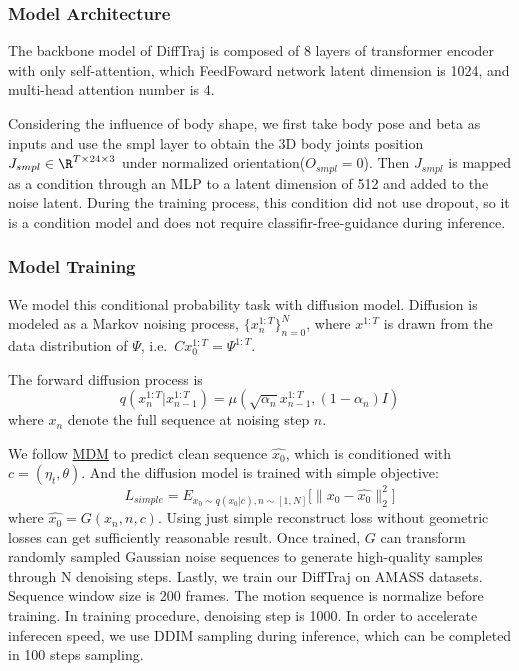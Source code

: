 \documentclass{article}
\begin{document}

\subsubsection{Model Architecture}\label{model-architecture}

The backbone model of DiffTraj is composed of  8 layers of transformer encoder with only self-attention, which FeedFoward network latent dimension is 1024, and multi-head attention number is 4.

Considering the influence of body shape, we first take body pose and beta as inputs and use the smpl layer to obtain the 3D body joints position $J_{smpl} \in \R^{T \times 24 \times 3}$ under normalized orientation($O_{smpl}=0$). Then $J_{smpl}$ is mapped as a condition through an MLP to a latent dimension of 512 and added to the noise latent. During the training process, this condition did not use dropout, so it is a condition model and does not require classifir-free-guidance during inference.

\subsubsection{Model Training}\label{model-training}

We model this conditional probability task with diffusion model. Diffusion is modeled as a Markov noising process, ${\{x^{1:T}_n\}_{n=0}^N}$, where $x^{1:T}$ is drawn from the data distribution of $\Psi$, i.e.~$Cx^{1:T}_0=\Psi^{1:T}$.

The forward diffusion process is \[
q(x_{n}^{1:T}|x_{n-1}^{1:T}) = \mu(\sqrt{\alpha_n}x_{n-1}^{1:T}, (1-\alpha_n)I)
\] where $x_{n}$ denote the full sequence at noising step $n$.

We follow \href{https://github.com/GuyTevet/motion-diffusion-model}{MDM} to predict clean sequence $\hat{x_0}$, which is conditioned with $c=(\eta_t,\theta)$. And the diffusion model is trained with simple objective: \[
L_{simple} = E_{x_0 \sim q(x_0|c),n \sim [1,N]} \big[\big\|x_0-\hat{x_0}\big\|^2_2\big]
\] where $\hat{x_0} = G(x_n,n,c)$. Using just simple reconstruct loss without geometric losses can get sufficiently reasonable result. Once trained, $G$ can transform randomly sampled Gaussian noise sequences to generate high-quality samples through N denoising steps. Lastly, we train our DiffTraj on AMASS datasets. Sequence window size is 200 frames. The motion sequence is normalize before training. In training procedure, denoising step is 1000. In order to accelerate inferecen speed, we use DDIM sampling during inference, which can be completed in 100 steps sampling.
\end{document}
